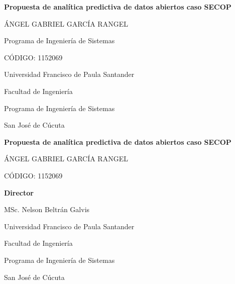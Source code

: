 \documentclass[12pt,letterpaper,oneside]{report}
\newcommand{\tituloproyecto}{Propuesta de analítica predictiva de datos abiertos caso SECOP}
\newcommand{\autorproyecto}{Ángel Gabriel García Rangel}
\newcommand{\codigoautor}{1152069}
\newcommand{\directorproyecto}{MSc. Nelson Beltrán Galvis}
\newcommand{\universidad}{Universidad Francisco de Paula Santander}
\newcommand{\facultad}{Facultad de Ingeniería}
\newcommand{\programa}{Programa de Ingeniería de Sistemas}
\newcommand{\ciudadanio}{San José de Cúcuta\\ \the\year}
\begin{document}

\begin{titlepage}
\centering
\vspace*{2cm}


{\large\bfseries \tituloproyecto\par}
\vspace{3cm}

{\large \MakeUppercase{\autorproyecto}\par}
\vspace{0.5cm}
{\normalsize \programa\par}
\vspace{0.5cm}
{\normalsize CÓDIGO: \codigoautor\par}
\vspace{3cm}

{\large \universidad\par}
\vspace{0.5cm}
{\normalsize \facultad\par}
\vspace{0.5cm}
{\normalsize \programa\par}
\vspace{1cm}
{\normalsize \ciudadanio\par}
\end{titlepage}

\begin{titlepage}
\centering
\vspace*{2cm}

{\large\bfseries \tituloproyecto\par}
\vspace{2cm}

{\large \MakeUppercase{\autorproyecto}\par}
\vspace{0.5cm}
{\normalsize CÓDIGO: \codigoautor\par}
\vspace{2cm}

{\normalsize \textbf{Director}\par}
{\normalsize \directorproyecto\par}
\vspace{3cm}

{\large \universidad\par}
\vspace{0.5cm}
{\normalsize \facultad\par}
\vspace{0.5cm}
{\normalsize \programa\par}
\vspace{1cm}
{\normalsize \ciudadanio\par}
\end{titlepage}
\end{document}
